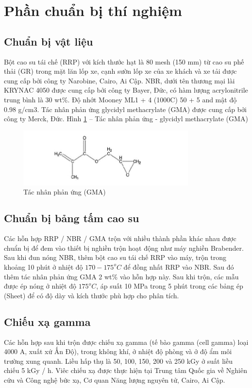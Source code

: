 \documentclass[12pt,a4paper]{article}
\begin{document}
	\section{Phần chuẩn bị thí nghiệm}%
		\subsection{Chuẩn bị vật liệu}
		Bột cao su tái chế (RRP) với kích thước hạt là 80 mesh (150 mm) từ cao su phế thải (GR) trong mặt lăn lốp xe, cạnh sườn lốp xe của xe khách và xe tải được cung cấp bởi công ty Narobine, Cairo, Ai Cập. NBR, dưới tên thương mại lài KRYNAC 4050 được cung cấp bởi công ty Bayer, Đức, có hàm lượng acrylonitrile trung bình là 30 wt\%. Độ nhớt Mooney ML1 + 4 (1000C) 50 + 5 and mật độ 0.98 g/cm3. Tác nhân phản ứng glycidyl methacrylate (GMA) được cung cấp bởi công ty Merck, Đức. Hình \ref{fig:hinh2} – Tác nhân phản ứng - glycidyl methacrylate (GMA)
		\begin{figure}
			\centering
			\includegraphics[width=0.8\textwidth]{2.JPG}
			\caption{Tác nhân phản ứng (GMA)}	
			\label{fig:hinh2}	
		\end{figure}
		
		\subsection{Chuẩn bị bảng tấm cao su}
		Các hỗn hợp RRP / NBR / GMA trộn với nhiều thành phần khác nhau được chuẩn bị để đem vào thiết bị nghiền trộn hoạt động như máy nghiền Brabender. Sau khi đun nóng NBR, thêm bột cao su tái chế RRP vào máy, trộn trong khoảng 10 phút ở nhiệt độ $170 - 175 ^o C$ để đồng nhất RRP vào NBR. Sau đó thêm tác nhân phản ứng GMA 2 wt\% vào hỗn hợp này. Sau khi trộn, các mẫu được ép nóng ở nhiệt độ $175^o C$, áp suất 10 MPa trong 5 phút trong các bảng ép (Sheet) để có độ dày và kích thước phù hợp cho phân tích.
		\subsection{Chiếu xạ gamma}%
		Các hỗn hợp sau khi trộn được chiếu xạ gamma (tế bào gamma (cell gamma) loại 4000 A, xuất xứ Ấn Độ), trong không khí, ở nhiệt độ phòng và ở độ ẩm môi trường xung quanh. Liều hấp thụ là 50, 100, 150, 200 và 250 kGy ở suất liều chiếu 5 kGy / h. Viêc chiếu xạ được thực hiện tại Trung tâm Quốc gia về Nghiên cứu và Công nghệ bức xạ, Cơ quan Năng lượng nguyên tử, Cairo, Ai Cập.
\end{document}
